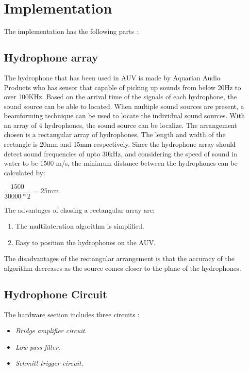 \section{Implementation}\label{sec:implementation}
The implementation has the following parts :

\subsection{Hydrophone array}
The hydrophone that has been used in AUV is made by Aquarian Audio Products who has sensor that capable of picking up sounds from below 20Hz to over 100KHz. Based on the arrival time of the signals of each hydrophone, the sound source can be able to located. When multiple sound sources are present, a beamforming technique can be used to locate the individual sound sources. \newline
With an array of 4 hydrophones, the sound source can be localize. The arrangement chosen is a rectangular array of hydrophones. The length and width of the rectangle is 20mm and 15mm respectively. Since the hydrophone array should detect sound frequencies of upto 30kHz, and considering the speed of sound in water to be 1500 m/s, the minimum distance between the hydrophones can be calculated by:
\begin{center}
$\dfrac{1500}{30000 * 2}$ = 25mm.
\end{center}

The advantages of chosing a rectangular array are:\begin{enumerate}
\item The multilateration algorithm is simplified.
\item Easy to position the hydrophones on the AUV.
\end{enumerate}
The disadvantages of the rectangular arrangement is that the accuracy of the algorithm decreases as the source comes closer to the plane of the hydrophones. 


\subsection{Hydrophone Circuit}
The hardware section includes three circuits :
\begin{itemize}
   \item { \em Bridge amplifier circuit.}
   \item { \em Low pass filter. }
   \item { \em Schmitt trigger circuit. }
\end{itemize}
